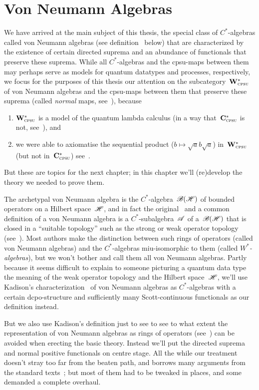 \documentclass[a]{subfiles}
\begin{document}
\chapter{Von Neumann Algebras}
\begin{parsec}%
We have arrived at the main subject of this thesis,
the special class of $C^*$-algebras
called von Neumann algebras (see definition~ below)
that are characterized by the existence
of certain directed suprema 
and an abundance  of functionals that preserve
these suprema.
While all $C^*$-algebras
and the cpsu-maps
between them
may perhaps serve as models for
quantum datatypes and processes, respectively,
we focus
for the purposes of this thesis
 our attention on
the subcategory~$\mathbf{W}^*_{\text{\textsc{cpsu}}}$ of von Neumann algebras
and the cpsu-maps between them that preserve these suprema
(called \emph{normal} maps, see~),
because 
\begin{enumerate}
\item
$\mathbf{W}^*_{\text{\textsc{cpsu}}}$
is a model of the quantum lambda calculus
(in a way that~$\mathbf{C}^*_{\text{\textsc{cpsu}}}$ is not,
see~), and
\item
we were able to axiomatise
the sequential product ($b\mapsto \sqrt{a}b\sqrt{a}$)
in~$\mathbf{W}^*_{\text{\textsc{cpsu}}}$ 
(but not in~$\mathbf{C}^*_{\text{\textsc{cpsu}}}$)
see~.
\end{enumerate}
But these are topics for the next chapter;
in this chapter we'll (re)develop the theory
we needed to prove them.

The archetypal von Neumann algebra
is the $C^*$-algebra~$\mathscr{B}(\mathscr{H})$
of bounded operators on a Hilbert space~$\mathscr{H}$,
and in fact 
the
original~\cite{vn1930,mvn1936}
and a common~\cite{kr,conway2000} 
definition of a von Neumann algebra
is a $C^*$-subalgebra~$\mathscr{A}$
of a~$\mathscr{B}(\mathscr{H})$
that is closed in a ``suitable topology''
such as the strong or weak operator topology
(see~).
Most authors make the distinction
between such rings of operators
(called von Neumann algebras)
and the $C^*$-algebras
miu-isomorphic to them
(called \emph{$W^*$-algebras}),
but we won't bother and call them all von Neumann algebras.
Partly because it seems difficult
to explain 
to someone
picturing a quantum data type
the meaning of the weak operator topology
and the Hilbert space~$\mathscr{H}$,
we'll use Kadison's characterization~\cite{kadison1956}
of von Neumann algebras
as $C^*$-algebras
with a certain dcpo-structure 
and sufficiently many Scott-continuous functionals
as our definition instead.

But we also use Kadison's definition
just to see to see
to what extent the representation
of von Neumann algebras
as rings of operators (see~) can be avoided
when erecting the basic theory.
Instead we'll put the directed suprema and normal 
positive functionals
on centre stage.
All the while
our treatment doesn't stray too far
from the beaten path,
and borrows
many arguments
from
the standard texts~\cite{sakai,kr};
but  most of them had to be tweaked in places, and
some demanded a complete overhaul.


\end{parsec}
\end{document}
